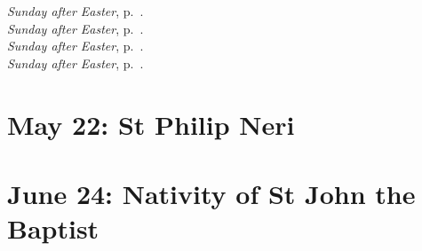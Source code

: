 {{{\begin{multicols}{2}
\noindent\emph{ Sunday after Easter}, p.~\pageref{easter2}.\\
\emph{ Sunday after Easter}, p.~\pageref{easter3}.\\
\emph{ Sunday after Easter}, p.~\pageref{easter4}.\\
\emph{ Sunday after Easter}, p.~\pageref{easter5}.
\end{multicols}
}
\bigskip
\benedicamusdomino{}
}

{
\section{May 22: St Philip Neri}
\subtitle{ Class (proper to the Oratory), White or Gold}
\subtitle{I \& II Vespers}

\def\definevesperspropers{
}
\def\definevesperspropersalt{
}
\def\vesperspropersnote{At II Vespers:}
\def\vesperspropersaltnote{At I Vespers:}

\medskip
{}

\bigskip{}
\benedicamusdomino{}
\pagebreak
}

{
\section{June 24: Nativity of St John the Baptist}
\subtitle{ Class, White or Gold}
\subtitle{I \& II Vespers}

\def\definevesperspropers{
  \let\oldthing=\antonetranslation
  \def\antonetranslation{\oldthing\pagebreak}
}
\def\definevesperspropersalt{}
\def\vesperspropersnote{At II Vespers:}
\def\vesperspropersaltnote{At I Vespers:}
\def\prevesperspsalms{\noindent\printnote{Chapter and following, page \pageref{june24-chapter}.\\}}
\def\vesperspsalmslabel{\label{june24-2vespers}}
\def\prevesperspsalmsalt{\noindent\printnote{II Vespers psalms and antiphons, page \pageref{june24-2vespers}.}\medskip}
\def\prechapter{\label{june24-chapter}}
\def\premagnificat{\pagebreak}

}}

